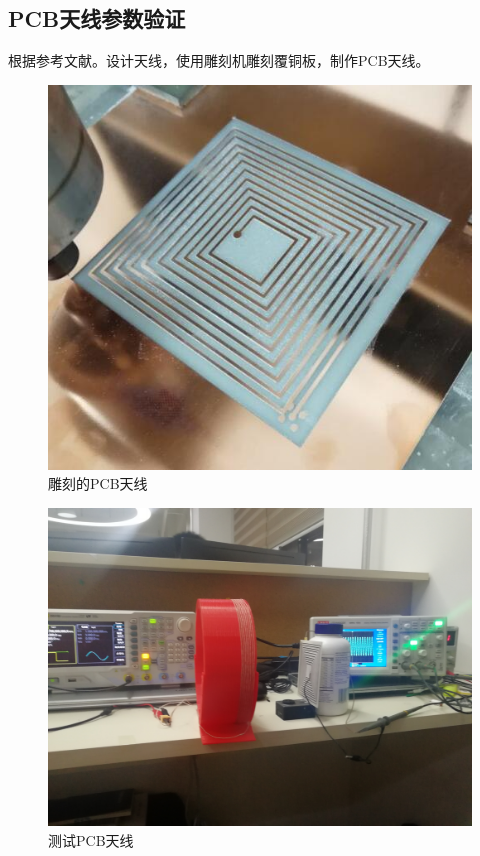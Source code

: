 ﻿\documentclass[UTF-8,a4paper,12pt]{ctexart}
\begin{document}
    \subsection{PCB天线参数验证}
         根据参考文献。设计天线，使用雕刻机雕刻覆铜板，制作PCB天线。
        \begin{figure}[H]
          \centering
          \includegraphics[scale=0.6]{5200.jpg}
          \caption{雕刻的PCB天线}
          \label{PCB-E}
        \end{figure}
        
        \begin{figure}[H]
          \centering
          \includegraphics[scale=0.6]{test_freq.jpg}
          \caption{测试PCB天线}
          \label{测试PCB天线}
        \end{figure}
        
\end{document}
